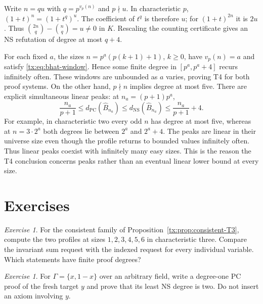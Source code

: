 \documentclass[11pt,a4paper,oneside,openany]{book}
\theoremstyle{definition}\newtheorem{definition}[theorem]{Definition}
\theoremstyle{remark}\newtheorem{remark}[theorem]{Remark}
\newtheorem{exercise}[theorem]{Exercise}
\numberwithin{equation}{chapter}
\begin{document}
Write $n=qu$ with $q=p^{v_p(n)}$ and $p\nmid u$. In characteristic
$p$, $(1+t)^n=(1+t^q)^u$. The coefficient of $t^q$ is therefore $u$;
for $(1+t)^{2n}$ it is $2u$. Thus
$\binom{2n}q-\binom nq=u\ne0$ in $K$. Rescaling the counting
certificate gives an NS refutation of degree at most $q+4$.

For each fixed $a$, the sizes $n=p^a(p(k+1)+1)$, $k\geq0$, have
$v_p(n)=a$ and satisfy \eqref{tx:eq:bhat-window}. Hence some finite degree in
$[p^a,p^a+4]$ recurs infinitely often. These windows are unbounded as $a$
varies, proving T4 for both proof systems. On the other hand, $p\nmid n$
implies degree at most five. There are explicit simultaneous linear peaks:
at $n_a=(p+1)p^a$,
\[
 \frac{n_a}{p+1}\leq d_{\mathrm{PC}}(\widehat B_{n_a})
 \leq d_{\mathrm{NS}}(\widehat B_{n_a})
 \leq\frac{n_a}{p+1}+4.
\]
For example, in characteristic two every odd $n$ has degree at most
five, whereas at $n=3\cdot2^a$ both degrees lie between $2^a$ and
$2^a+4$. The peaks are linear in their universe size even though the
profile returns to bounded values infinitely often.
Thus linear peaks coexist with infinitely many easy sizes. This is the
reason the T4 conclusion concerns peaks rather than an eventual linear
lower bound at every size.

\section{Exercises}
\begin{exercise}\label{tx:ex:sum-versus-individual}
For the consistent family of Proposition~\ref{tx:prop:consistent-T3},
compute the two profiles at sizes $1,2,3,4,5,6$ in characteristic three.
Compare the invariant sum request with the indexed request for every
individual variable. Which statements have finite proof degrees?
\end{exercise}
\par\medskip

\begin{exercise}\label{tx:ex:fresh-small}
For $\Gamma=\{x,1-x\}$ over an arbitrary field, write a degree-one PC
proof of the fresh target $y$ and prove that its least NS degree is two.
Do not insert an axiom involving $y$.
\end{exercise}
\par\medskip
\end{document}
